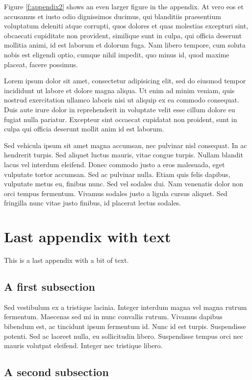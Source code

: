 \documentclass[letterpaper,11pt,leqno]{article}
\begin{document}
Figure \ref{f:appendix2} shows an even larger figure in the appendix. At vero eos et accusamus et iusto odio dignissimos ducimus, qui blanditiis praesentium voluptatum deleniti atque corrupti, quos dolores et quas molestias excepturi sint, obcaecati cupiditate non provident, similique sunt in culpa, qui officia deserunt mollitia animi, id est laborum et dolorum fuga. Nam libero tempore, cum soluta nobis est eligendi optio, cumque nihil impedit, quo minus id, quod maxime placeat, facere possimus.

Lorem ipsum dolor sit amet, consectetur adipisicing elit, sed do eiusmod
tempor incididunt ut labore et dolore magna aliqua. Ut enim ad minim veniam,
quis nostrud exercitation ullamco laboris nisi ut aliquip ex ea commodo
consequat. Duis aute irure dolor in reprehenderit in voluptate velit esse
cillum dolore eu fugiat nulla pariatur. Excepteur sint occaecat cupidatat non
proident, sunt in culpa qui officia deserunt mollit anim id est laborum.

Sed vehicula ipsum sit amet magna accumsan, nec pulvinar nisl consequat. In ac hendrerit turpis. Sed aliquet luctus mauris, vitae congue turpis. Nullam blandit lacus vel interdum eleifend. Donec commodo justo a eros malesuada, eget vulputate tortor accumsan. Sed ac pulvinar nulla. Etiam quis felis dapibus, vulputate metus eu, finibus nunc. Sed vel sodales dui. Nam venenatis dolor non orci tempus fermentum. Vivamus sodales justo a ligula cursus aliquet. Sed fringilla nunc vitae justo finibus, id placerat lectus sodales.

\section{Last appendix with text}

This is a last appendix with a bit of text.

\subsection{A first subsection}

Sed vestibulum ex a tristique lacinia. Integer interdum magna vel magna rutrum fermentum. Maecenas sed mi in nunc convallis rutrum. Vivamus dapibus bibendum est, ac tincidunt ipsum fermentum id. Nunc id est turpis. Suspendisse potenti. Sed ac laoreet nulla, eu sollicitudin libero. Suspendisse tempus orci nec mauris volutpat eleifend. Integer nec tristique libero. 

\subsection{A second subsection}
\end{document}
